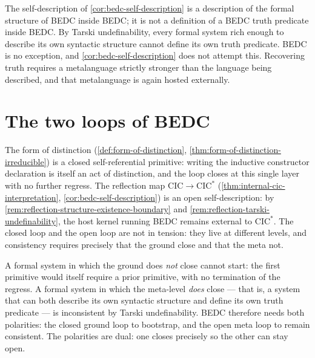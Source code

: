 \begin{remark}
\label{rem:reflection-tarski-undefinability}
The self-description of \autoref{cor:bedc-self-description} is a description of the formal structure of BEDC inside BEDC; it is not a definition of a BEDC truth predicate inside BEDC. By Tarski undefinability, every formal system rich enough to describe its own syntactic structure cannot define its own truth predicate. BEDC is no exception, and \autoref{cor:bedc-self-description} does not attempt this. Recovering truth requires a metalanguage strictly stronger than the language being described, and that metalanguage is again hosted externally.
\end{remark}

\section{The two loops of BEDC}
\label{sec:reflection-two-loops}

\begin{theorem}
\label{thm:two-loops}
The form of distinction (\autoref{def:form-of-distinction}, \autoref{thm:form-of-distinction-irreducible}) is a closed self-referential primitive: writing the inductive constructor declaration is itself an act of distinction, and the loop closes at this single layer with no further regress. The reflection map $\mathrm{CIC} \to \mathrm{CIC}^{*}$ (\autoref{thm:internal-cic-interpretation}, \autoref{cor:bedc-self-description}) is an open self-description: by \autoref{rem:reflection-structure-existence-boundary} and \autoref{rem:reflection-tarski-undefinability}, the host kernel running BEDC remains external to $\mathrm{CIC}^{*}$. The closed loop and the open loop are not in tension: they live at different levels, and consistency requires precisely that the ground close and that the meta not.
\end{theorem}

\begin{remark}
\label{rem:two-loops-polarities}
A formal system in which the ground does \emph{not} close cannot start: the first primitive would itself require a prior primitive, with no termination of the regress. A formal system in which the meta-level \emph{does} close — that is, a system that can both describe its own syntactic structure and define its own truth predicate — is inconsistent by Tarski undefinability. BEDC therefore needs both polarities: the closed ground loop to bootstrap, and the open meta loop to remain consistent. The polarities are dual: one closes precisely so the other can stay open.
\end{remark}

